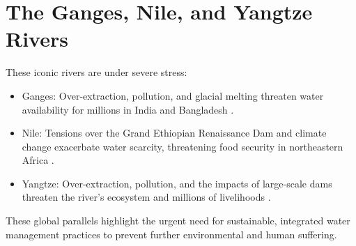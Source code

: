 \section{The Ganges, Nile, and Yangtze Rivers}
    These iconic rivers are under severe stress: 
\begin{itemize}
    \item Ganges: Over-extraction, pollution, and glacial melting threaten water availability for millions in India and Bangladesh \autocite{wwf2025ganges}\autocite{rai2024ganga}.
    \item  Nile: Tensions over the Grand Ethiopian Renaissance Dam and climate change exacerbate water scarcity, threatening food security in northeastern Africa \autocite{mbaku2023dam}\autocite{fayoumi2023impact}. 
    \item Yangtze: Over-extraction, pollution, and the impacts of large-scale dams threaten the river’s ecosystem and millions of livelihoods \autocite{mehra2024yangtze}.
\end{itemize}
     
These global parallels highlight the urgent need for sustainable, integrated water management practices to prevent further environmental and human suffering. 